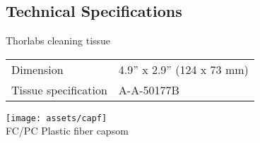\documentclass{article}
\begin{document}
\begin{multicols}{2}

\section{Technical Specifications}

Thorlabs cleaning tissue

\begin{tabular}{|l|l|}
  Dimension & 4.9'' x 2.9'' (124 x 73 mm) \\
  Tissue specification & A-A-50177B \\
\end{tabular}%


\end{multicols}
\begin{center}
\texttt{[image: assets/capf]} \\
FC/PC Plastic fiber capsom
\end{center}
\end{document}
